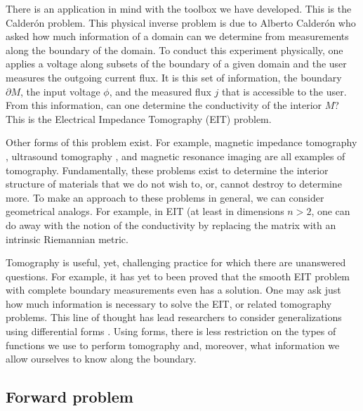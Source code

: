 There is an application in mind with the toolbox we have developed. This is the Calder\'on problem. This physical inverse problem is due to  Alberto Calder\'on who asked how much information of a domain can we determine from measurements along the boundary of the domain. To conduct this experiment physically, one applies a voltage along subsets of the boundary of a given domain and the user measures the outgoing current flux. It is this set of information, the boundary $\partial M$, the input voltage $\phi$, and the measured flux $j$ that is accessible to the user. From this information, can one determine the conductivity of the interior $M$? This is the Electrical Impedance Tomography (EIT) problem. 

Other forms of this problem exist. For example, magnetic impedance tomography , ultrasound tomography , and magnetic resonance imaging are all examples of tomography.  Fundamentally, these problems exist to determine the interior structure of materials that we do not wish to, or, cannot destroy to determine more. To make an approach to these problems in general, we can consider geometrical analogs. For example, in EIT (at least in dimensions $n>2$, one can do away with the notion of the conductivity by replacing the matrix with an intrinsic Riemannian metric. 

Tomography is useful, yet, challenging practice for which there are unanswered questions. For example, it has yet to been proved that the smooth EIT problem with complete boundary measurements even has a solution.  One may ask just how much information is necessary to solve the EIT, or related tomography problems. This line of thought has lead researchers to consider generalizations using differential forms . Using forms, there is less restriction on the types of functions we use to perform tomography and, moreover, what information we allow ourselves to know along the boundary. 

\subsection{Forward problem}

